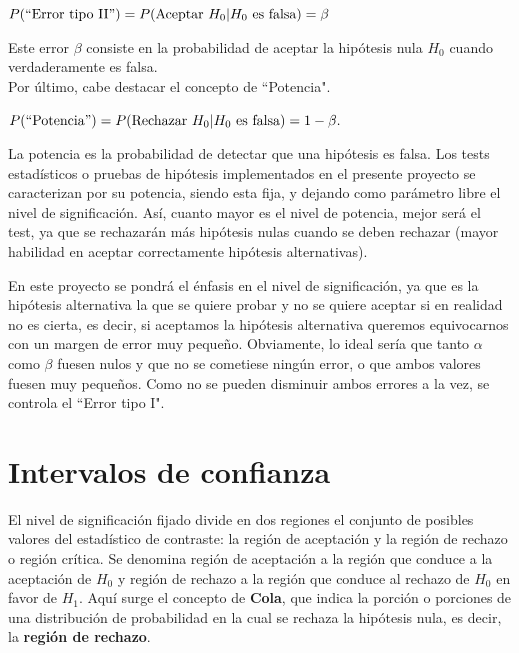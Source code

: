 \begin{center}
$P(\mbox{``Error tipo II}") = P(\mbox{Aceptar } H_0|H_0 \mbox{ es falsa}) =\beta$
\end{center}
Este error $\beta$ consiste en la probabilidad de aceptar la hipótesis nula $H_0$ cuando verdaderamente es
falsa.
\\Por último, cabe destacar el concepto de ``Potencia".
\begin{center}
$P(\mbox{``Potencia}") = P(\mbox{Rechazar } H_0|H_0 \mbox{ es falsa}) =1-\beta.$
\end{center}
La potencia es la probabilidad de detectar que una hipótesis es falsa. Los tests estadísticos o pruebas de hipótesis
implementados en el presente proyecto se caracterizan por su potencia, siendo esta fija, y dejando como parámetro
libre el nivel de significación. Así, cuanto mayor es el nivel de potencia, mejor será el test, ya que se rechazarán
más hipótesis nulas cuando se deben rechazar (mayor habilidad en aceptar correctamente hipótesis alternativas).

En este proyecto se pondrá el énfasis en el nivel de significación, ya que es la hipótesis alternativa la que se
quiere probar y no se quiere aceptar si en realidad no es cierta, es decir, si aceptamos la hipótesis alternativa
queremos equivocarnos con un margen de error muy pequeño. Obviamente, lo ideal sería que tanto $\alpha$ como
$\beta$ fuesen nulos y que no se cometiese ningún error, o que ambos valores fuesen muy pequeños. Como no se pueden
disminuir ambos errores a la vez, se controla el ``Error tipo I".


\section{Intervalos de confianza}
El nivel de significación fijado divide en dos regiones el conjunto de posibles valores del estadístico de
contraste: la región de aceptación y la región de rechazo o región crítica. Se denomina región de aceptación
a la región que conduce a la aceptación de $H_0$ y región de rechazo a la región que conduce al rechazo de $H_0$
en favor de $H_1$. Aquí surge el concepto de \textbf{Cola}, que indica la porción o porciones de una distribución
de probabilidad en la cual se rechaza la hipótesis nula, es decir, la \textbf{región de rechazo}.

